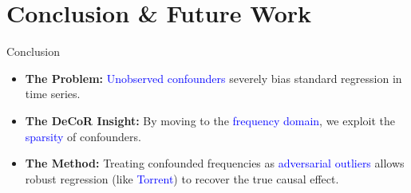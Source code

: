 \section{Conclusion \& Future Work}

\begin{frame}{Conclusion}
    \begin{itemize}
        \item \textbf{The Problem:} \textcolor{blue}{Unobserved confounders} severely bias standard regression in time series.
        \item \textbf{The DeCoR Insight:} By moving to the \textcolor{blue}{frequency domain}, we exploit the \textcolor{blue}{sparsity} of confounders.
        \item \textbf{The Method:} Treating confounded frequencies as \textcolor{blue}{adversarial outliers} allows robust regression (like \textcolor{blue}{Torrent}) to recover the true causal effect.
    \end{itemize}
\end{frame}